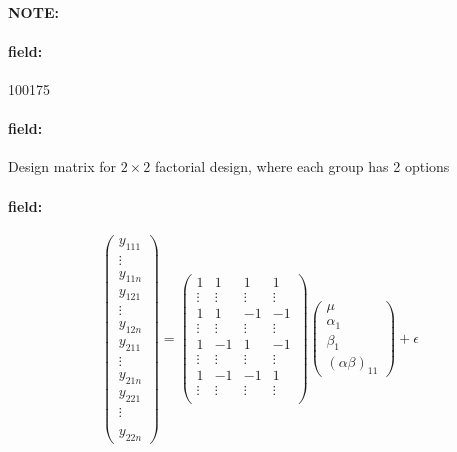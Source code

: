 \documentclass[12pt]{article}
\newenvironment{note}{\paragraph{NOTE:}}{}
\newenvironment{field}{\paragraph{field:}}{}
\begin{document}
\begin{note}
 \begin{field}
  \tiny 100175
 \end{field}
 \begin{field}
  Design matrix for $2 \times 2$ factorial design, where each group has 2 options
 \end{field}
 \begin{field}
  $$ \begin{pmatrix}
    y_{111} \\ \vdots \\ y_{11n} \\ y_{121} \\ \vdots \\
    y_{12n} \\ y_{211}\\ \vdots \\ y_{21n} \\ y_{221} \\ \vdots \\
    \\ y_{22n}
   \end{pmatrix} =
   \begin{pmatrix}
    1      & 1      & 1      & 1      \\
    \vdots & \vdots & \vdots & \vdots \\
    1      & 1      & -1     & -1     \\
    \vdots & \vdots & \vdots & \vdots \\
    1      & -1     & 1      & -1     \\
    \vdots & \vdots & \vdots & \vdots \\
    1      & -1     & -1     & 1      \\
    \vdots & \vdots & \vdots & \vdots \\
   \end{pmatrix}
   \begin{pmatrix}
    \mu \\ \alpha_1 \\ \beta_1 \\ (\alpha\beta)_{11}
   \end{pmatrix} + \epsilon $$
 \end{field}
\end{note}
\end{document}
